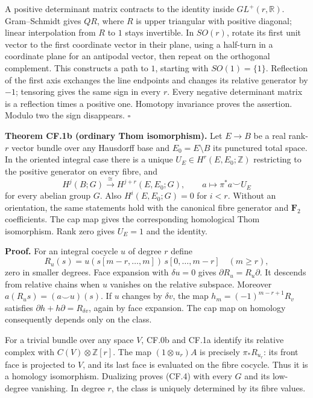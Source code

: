 \documentclass[
  11pt,
]{article}
\begin{document}
A positive determinant matrix contracts to the identity inside
\(GL^+(r,\mathbb R)\). Gram--Schmidt gives \(QR\), where \(R\) is upper
triangular with positive diagonal; linear interpolation from \(R\) to
\(1\) stays invertible. In \(SO(r)\), rotate its first unit vector to
the first coordinate vector in their plane, using a half-turn in a
coordinate plane for an antipodal vector, then repeat on the orthogonal
complement. This constructs a path to \(1\), starting with
\(SO(1)=\{1\}\). Reflection of the first axis exchanges the line
endpoints and changes its relative generator by \(-1\); tensoring gives
the same sign in every \(r\). Every negative determinant matrix is a
reflection times a positive one. Homotopy invariance proves the
assertion. Modulo two the sign disappears. \(\square\)

\textbf{Theorem CF.1b (ordinary Thom isomorphism).} Let \(E\to B\) be a
real rank-\(r\) vector bundle over any Hausdorff base and
\(E_0=E\setminus B\) its punctured total space. In the oriented integral
case there is a unique \(U_E\in H^r(E,E_0;\mathbb Z)\) restricting to
the positive generator on every fibre, and \[
H^j(B;G)\xrightarrow{\ \cong\ }H^{j+r}(E,E_0;G),
\qquad a\longmapsto\pi^*a\smile U_E
\tag{CF.4}
\] for every abelian group \(G\). Also \(H^i(E,E_0;G)=0\) for \(i<r\).
Without an orientation, the same statements hold with the canonical
fibre generator and \(\mathbf F_2\) coefficients. The cap map gives the
corresponding homological Thom isomorphism. Rank zero gives \(U_E=1\)
and the identity.

\textbf{Proof.} For an integral cocycle \(u\) of degree \(r\) define \[
R_u(s)=u(s[m-r,\ldots,m])\,s[0,\ldots,m-r]\quad(m\geq r),
\] zero in smaller degrees. Face expansion with \(\delta u=0\) gives
\(\partial R_u=R_u\partial\). It descends from relative chains when
\(u\) vanishes on the relative subspace. Moreover
\(a(R_us)=(a\smile u)(s)\). If \(u\) changes by \(\delta v\), the map
\(h_m=(-1)^{m-r+1}R_v\) satisfies \(\partial h+h\partial=R_{\delta v}\),
again by face expansion. The cap map on homology consequently depends
only on the class.

For a trivial bundle over any space \(V\), CF.0b and CF.1a identify its
relative complex with \(C(V)\otimes\mathbb Z[r]\). The map
\((1\otimes u_r)A\) is precisely \(\pi_*R_{u_r}\): its front face is
projected to \(V\), and its last face is evaluated on the fibre cocycle.
Thus it is a homology isomorphism. Dualizing proves (CF.4) with every
\(G\) and its low-degree vanishing. In degree \(r\), the class is
uniquely determined by its fibre values.
\end{document}
